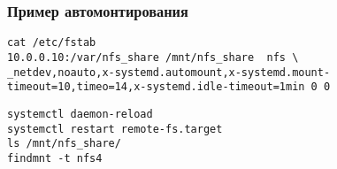 \begin{frame}[fragile]
    \frametitle{Пример автомонтирования}
\begin{lstlisting}
cat /etc/fstab
10.0.0.10:/var/nfs_share /mnt/nfs_share  nfs \
_netdev,noauto,x-systemd.automount,x-systemd.mount-timeout=10,timeo=14,x-systemd.idle-timeout=1min 0 0
\end{lstlisting}

\begin{lstlisting}
systemctl daemon-reload
systemctl restart remote-fs.target
ls /mnt/nfs_share/
findmnt -t nfs4
\end{lstlisting}

\end{frame}